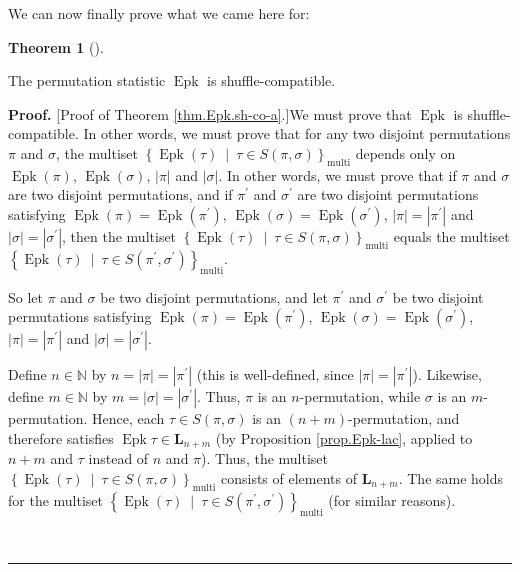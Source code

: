 \documentclass[numbers=enddot,12pt,final,onecolumn,notitlepage]{scrartcl}%
\theoremstyle{definition}
\newtheorem{theo}{Theorem}[section]
\newenvironment{theorem}[1][]
{\begin{theo}[#1]\begin{leftbar}}
{\end{leftbar}\end{theo}}
\newenvironment{proof}[1][Proof]{\noindent\textbf{#1.} }{\ \rule{0.5em}{0.5em}}
\begin{document}
We can now finally prove what we came here for:

\begin{theorem}
\label{thm.Epk.sh-co-a}The permutation statistic $\operatorname*{Epk}$ is shuffle-compatible.
\end{theorem}

\begin{proof}
[Proof of Theorem \ref{thm.Epk.sh-co-a}.]We must prove that
$\operatorname*{Epk}$ is shuffle-compatible. In other words, we must prove
that for any two disjoint permutations $\pi$ and $\sigma$, the multiset
$\left\{  \operatorname*{Epk}\left(  \tau\right)  \ \mid\ \tau\in S\left(
\pi,\sigma\right)  \right\}  _{\operatorname*{multi}}$ depends only on
$\operatorname*{Epk}\left(  \pi\right)  $, $\operatorname*{Epk}\left(
\sigma\right)  $, $\left\vert \pi\right\vert $ and $\left\vert \sigma
\right\vert $. In other words, we must prove that if $\pi$ and $\sigma$ are
two disjoint permutations, and if $\pi^{\prime}$ and $\sigma^{\prime}$ are two
disjoint permutations satisfying $\operatorname*{Epk}\left(  \pi\right)
=\operatorname*{Epk}\left(  \pi^{\prime}\right)  $, $\operatorname*{Epk}%
\left(  \sigma\right)  =\operatorname*{Epk}\left(  \sigma^{\prime}\right)  $,
$\left\vert \pi\right\vert =\left\vert \pi^{\prime}\right\vert $ and
$\left\vert \sigma\right\vert =\left\vert \sigma^{\prime}\right\vert $, then
the multiset $\left\{  \operatorname*{Epk}\left(  \tau\right)  \ \mid\ \tau\in
S\left(  \pi,\sigma\right)  \right\}  _{\operatorname*{multi}}$ equals the
multiset $\left\{  \operatorname*{Epk}\left(  \tau\right)  \ \mid\ \tau\in
S\left(  \pi^{\prime},\sigma^{\prime}\right)  \right\}
_{\operatorname*{multi}}$.

So let $\pi$ and $\sigma$ be two disjoint permutations, and let $\pi^{\prime}$
and $\sigma^{\prime}$ be two disjoint permutations satisfying
$\operatorname*{Epk}\left(  \pi\right)  =\operatorname*{Epk}\left(
\pi^{\prime}\right)  $, $\operatorname*{Epk}\left(  \sigma\right)
=\operatorname*{Epk}\left(  \sigma^{\prime}\right)  $, $\left\vert
\pi\right\vert =\left\vert \pi^{\prime}\right\vert $ and $\left\vert
\sigma\right\vert =\left\vert \sigma^{\prime}\right\vert $.

Define $n\in\mathbb{N}$ by $n=\left\vert \pi\right\vert =\left\vert
\pi^{\prime}\right\vert $ (this is well-defined, since $\left\vert
\pi\right\vert =\left\vert \pi^{\prime}\right\vert $). Likewise, define
$m\in\mathbb{N}$ by $m=\left\vert \sigma\right\vert =\left\vert \sigma
^{\prime}\right\vert $. Thus, $\pi$ is an $n$-permutation, while $\sigma$ is
an $m$-permutation. Hence, each $\tau\in S\left(  \pi,\sigma\right)  $ is an
$\left(  n+m\right)  $-permutation, and therefore satisfies
$\operatorname*{Epk}\tau\in\mathbf{L}_{n+m}$ (by Proposition
\ref{prop.Epk-lac}, applied to $n+m$ and $\tau$ instead of $n$ and $\pi$).
Thus, the multiset $\left\{  \operatorname*{Epk}\left(  \tau\right)
\ \mid\ \tau\in S\left(  \pi,\sigma\right)  \right\}  _{\operatorname*{multi}%
}$ consists of elements of $\mathbf{L}_{n+m}$. The same holds for the multiset
$\left\{  \operatorname*{Epk}\left(  \tau\right)  \ \mid\ \tau\in S\left(
\pi^{\prime},\sigma^{\prime}\right)  \right\}  _{\operatorname*{multi}}$ (for
similar reasons).


\end{proof}
\end{document}
